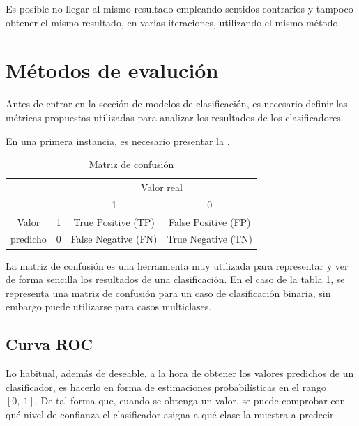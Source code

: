 Es posible no llegar al mismo resultado empleando sentidos contrarios y tampoco obtener el mismo resultado, en varias iteraciones, utilizando el mismo método.


\newpage
\section{Métodos de evalución}

Antes de entrar en la sección de modelos de clasificación, es necesario definir las métricas propuestas utilizadas para analizar los resultados de los clasificadores.

En una primera instancia, es necesario presentar la .

\begin{table}[h]
	\centering
	\caption{Matriz de confusión}
	\label{tab:matriz_confusion}
	\begin{tabular}{cc|cc|}
		\cline{3-4}
		&  & \multicolumn{2}{c|}{Valor real} \\ \cline{3-4} 
		&  & \multicolumn{1}{c|}{1}    & 0   \\ \hline
		\multicolumn{1}{|c|}{Valor}    & 1 & \multicolumn{1}{c|}{True Positive (TP)}  & False Positive (FP) \\ \cline{2-4} 
		\multicolumn{1}{|c|}{predicho} & 0 & \multicolumn{1}{c|}{False Negative (FN)} & True Negative (TN)  \\ \hline
	\end{tabular}
\end{table}

La matriz de confusión es una herramienta muy utilizada para representar y ver de forma sencilla los resultados de una clasificación. En el caso de la tabla \ref{tab:matriz_confusion}, se representa una matriz de confusión para un caso de clasificación binaria, sin embargo puede utilizarse para casos multiclases.

\subsection{Curva ROC} \label{subsection:ROC_curva}

Lo habitual, además de deseable, a la hora de obtener los valores predichos de un clasificador, es hacerlo en forma de estimaciones probabilísticas en el rango $[0,\:1]$. De tal forma que, cuando se obtenga un valor, se puede comprobar con qué nivel de confianza el clasificador asigna a qué clase la muestra a predecir.

